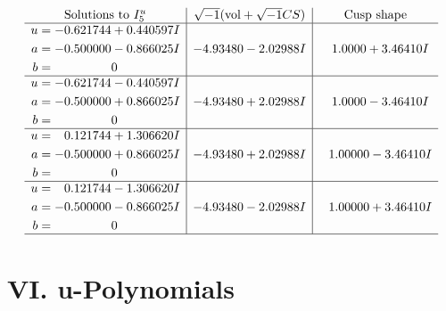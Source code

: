 \documentclass[1p]{elsarticle_modified}
\theoremstyle{definition}
\newcommand{\I}{\sqrt{-1}}
\begin{document}
$$\begin{array}{c|c|c}  
\text{Solutions to }I^u_{5}& \I (\text{vol} + \sqrt{-1}CS) & \text{Cusp shape}\\
 \hline 
\begin{aligned}
u &= -0.621744 + 0.440597 I \\
a &= -0.500000 - 0.866025 I \\
b &= \phantom{-0.000000 } 0\end{aligned}
 & -4.93480 - 2.02988 I & \phantom{-}1.0000 + 3.46410 I \\ \hline\begin{aligned}
u &= -0.621744 - 0.440597 I \\
a &= -0.500000 + 0.866025 I \\
b &= \phantom{-0.000000 } 0\end{aligned}
 & -4.93480 + 2.02988 I & \phantom{-}1.0000 - 3.46410 I \\ \hline\begin{aligned}
u &= \phantom{-}0.121744 + 1.306620 I \\
a &= -0.500000 + 0.866025 I \\
b &= \phantom{-0.000000 } 0\end{aligned}
 & -4.93480 + 2.02988 I & \phantom{-}1.00000 - 3.46410 I \\ \hline\begin{aligned}
u &= \phantom{-}0.121744 - 1.306620 I \\
a &= -0.500000 - 0.866025 I \\
b &= \phantom{-0.000000 } 0\end{aligned}
 & -4.93480 - 2.02988 I & \phantom{-}1.00000 + 3.46410 I\\
 \hline 
 \end{array}$$\newpage
\newpage\renewcommand{\arraystretch}{1}
\centering \section*{ VI. u-Polynomials}
\end{document}

